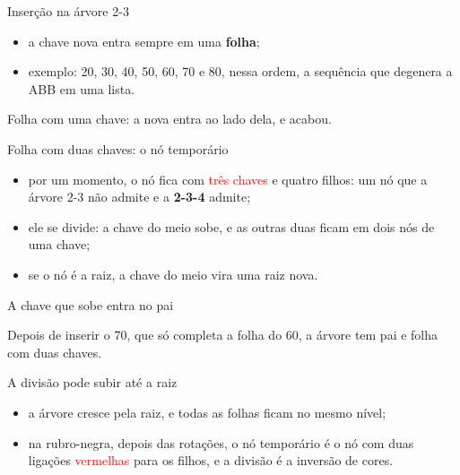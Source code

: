 \documentclass{beamer}
\newcommand{\tcr}[1]{\textcolor{red}{#1}}
\begin{document}
\begin{frame}{Inserção na árvore 2-3}
	\begin{itemize}
		\item a chave nova entra sempre em uma \textbf{folha};
		\item exemplo: 20, 30, 40, 50, 60, 70 e 80, nessa ordem, a sequência que
		      degenera a ABB em uma lista.
	\end{itemize}

	\vspace{0.5cm}
	\begin{center}
		\arvDoisTresA
	\end{center}

	\vspace{0.3cm}
	Folha com uma chave: a nova entra ao lado dela, e acabou.
\end{frame}

\begin{frame}{Folha com duas chaves: o nó temporário}
	\begin{center}
		\resizebox{\textwidth}{!}{\arvDoisTresB}
	\end{center}

	\vspace{0.3cm}
	\begin{itemize}
		\item por um momento, o nó fica com \tcr{três chaves} e quatro filhos: um nó
		      que a árvore 2-3 não admite e a \textbf{2-3-4} admite;
		\item ele se divide: a chave do meio sobe, e as outras duas ficam em dois
		      nós de uma chave;
		\item se o nó é a raiz, a chave do meio vira uma raiz nova.
	\end{itemize}
\end{frame}

\begin{frame}{A chave que sobe entra no pai}
	\begin{center}
		\resizebox{\textwidth}{!}{\arvDoisTresC}
	\end{center}

	\vspace{0.3cm}
	Depois de inserir o 70, que só completa a folha do 60, a árvore tem pai e
	folha com duas chaves.
\end{frame}

\begin{frame}{A divisão pode subir até a raiz}
	\begin{center}
		\resizebox{!}{0.6\textheight}{\arvDoisTresD}
	\end{center}

	\begin{itemize}
		\item a árvore cresce pela raiz, e todas as folhas ficam no mesmo nível;
		\item na rubro-negra, depois das rotações, o nó temporário é o nó com
		      duas ligações \tcr{vermelhas} para os filhos, e a divisão é a inversão
		      de cores.
	\end{itemize}
\end{frame}
\end{document}
